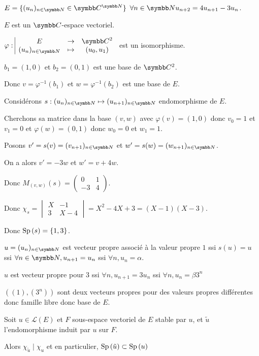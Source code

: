 \begin{exemple}
    $E = \{(u_n)_{n \in \N} \in \C^{\N}\}$ $\forall n \in \N u_{n + 2} = 4 u_{n + 1} - 3 u_n$.

    $E$ est un $\C$-espace vectoriel. 

    $\fonction \varphi E {\C^2} {(u_n)_{n \in \N}} {(u_0, u_1)}$ est un isomorphisme.

    $b_1 = (1, 0)$ et $b_2 = (0, 1)$ est une base de $\C^2$.

    Donc $v = \varphi^{-1} (b_1) $ et $w = \varphi^{-1} (b_2)$ est une base de $E$.

    Considérons $s : (u_n)_{n \in \N} \mapsto (u_{n + 1})_{n \in \N}$ endomorphisme de $E$.

    Cherchons sa matrice dans la base $(v, w)$ avec $\varphi(v) = (1, 0)$ donc 
    $v_0 = 1$ et $v_1 = 0$    
    et $\varphi(w) = (0, 1)$ donc $w_0 = 0$ et $w_1 = 1$.

    Posons $v' = s(v) = (v_{n + 1})_{n \in \N}$ et $w' = s(w) = (w_{n + 1})_{n \in \N}$.

    On a alors $v' = -3w$ et $w' = v + 4w$.

    Donc $M_{(v, w)}(s) = \begin{pmatrix}
        0 & 1 \\
        -3 & 4
    \end{pmatrix}$.

    Donc $\chi_s = \begin{vmatrix}
        X & -1 \\
        3 & X - 4
    \end{vmatrix} = X^2 - 4X + 3 = (X - 1)(X - 3)$.

    Donc $\operatorname{Sp} \,(s) = \{1, 3\}$.


    $u = (u_n)_{n \in \N}$ est vecteur propre associé à la valeur propre $1$ ssi 
    $s(u) = u$ ssi $\forall n \in \N, u_{n + 1} = u_n$ ssi $\forall n, u_n = \alpha$. 

    $u$ est vecteur propre pour $3$ ssi $\forall n, u_{n + 1} = 3 u_n$ ssi $\forall n, u_n = \beta 3^n$

    $((1), (3^n))$ sont deux vecteurs propres pour des valeurs propres différentes donc famille libre donc base de 
    $E$. 
\end{exemple}


\begin{proposition}{}{}
    Soit $u \in \mathscr L(E)$ et $F$ sous-espace vectoriel de $E$ stable par $u$, et $\tilde u$
    l'endomorphisme induit par $u$ sur $F$. 

    Alors 
    $\chi_{\tilde u} \mid \chi_u$ et en particulier, $\operatorname{Sp} \,(\tilde u) \subset \operatorname{Sp} \, (u)$
\end{proposition}

